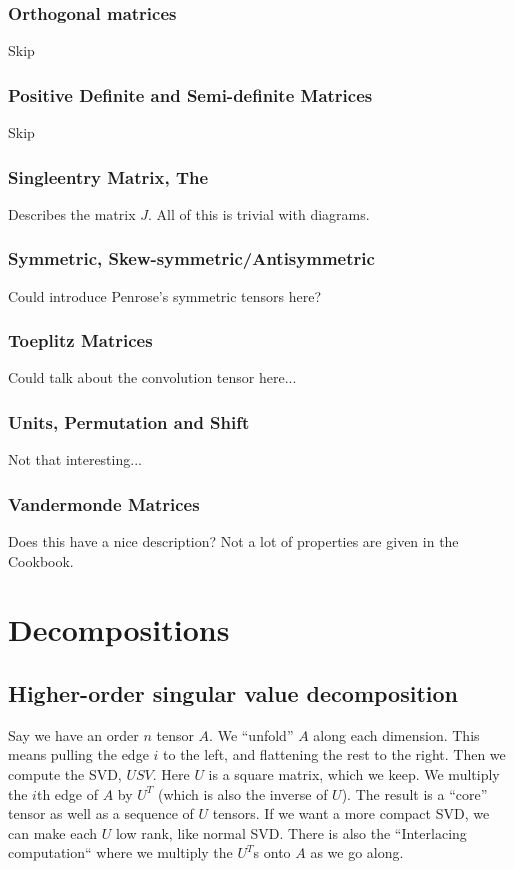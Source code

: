 \documentclass[oneside]{book}
\begin{document}
\subsection{Orthogonal matrices}
Skip
\subsection{Positive Definite and Semi-definite Matrices}
Skip
\subsection{Singleentry Matrix, The}
Describes the matrix $J$.
All of this is trivial with diagrams.
\subsection{Symmetric, Skew-symmetric/Antisymmetric}
Could introduce Penrose's symmetric tensors here?
\subsection{Toeplitz Matrices}
Could talk about the convolution tensor here...
\subsection{Units, Permutation and Shift}
Not that interesting...
\subsection{Vandermonde Matrices}
Does this have a nice description?
Not a lot of properties are given in the Cookbook.


\chapter{Decompositions}


\section{Higher-order singular value decomposition}
Say we have an order $n$ tensor $A$.
We ``unfold'' $A$ along each dimension.
This means pulling the edge $i$ to the left, and flattening the rest to the right.
Then we compute the SVD, $USV$.
Here $U$ is a square matrix, which we keep.
We multiply the $i$th edge of $A$ by $U^T$ (which is also the inverse of $U$).
The result is a ``core'' tensor as well as a sequence of $U$ tensors.
If we want a more compact SVD, we can make each $U$ low rank, like normal SVD.
There is also the ``Interlacing computation`` where we multiply the $U^T$s onto $A$ as we go along.
\end{document}

